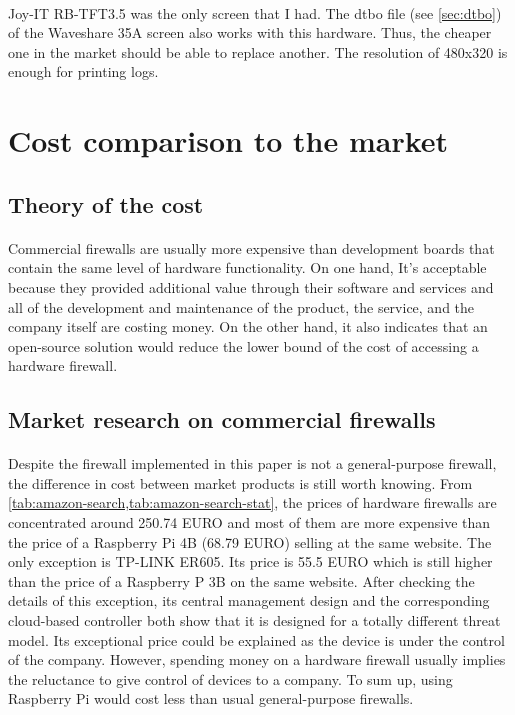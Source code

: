 \documentclass[mscthesis]{usiinfthesis}
\begin{document}
\paragraph{}
Joy-IT RB-TFT3.5 was the only screen that I had. The dtbo file (see \cref{sec:dtbo}) of the Waveshare 35A screen also works with this hardware. Thus, the cheaper one in the market should be able to replace another. The resolution of 480x320 is enough for printing logs.

\section{Cost comparison to the market}
\subsection{Theory of the cost}
\paragraph{}
Commercial firewalls are usually more expensive than development boards that contain the same level of hardware functionality. On one hand, It's acceptable because they provided additional value through their software and services and all of the development and maintenance of the product, the service, and the company itself are costing money. On the other hand, it also indicates that an open-source solution would reduce the lower bound of the cost of accessing a hardware firewall.

\subsection{Market research on commercial firewalls}
\paragraph{}
Despite the firewall implemented in this paper is not a general-purpose firewall, the difference in cost between market products is still worth knowing. From \cref{tab:amazon-search,tab:amazon-search-stat}, the prices of hardware firewalls are concentrated around 250.74 EURO and most of them are more expensive than the price of a Raspberry Pi 4B (68.79 EURO) selling at the same website. The only exception is TP-LINK ER605. Its price is 55.5 EURO which is still higher than the price of a Raspberry P 3B on the same website. After checking the details of this exception, its central management design and the corresponding cloud-based controller both show that it is designed for a totally different threat model. Its exceptional price could be explained as the device is under the control of the company. However, spending money on a hardware firewall usually implies the reluctance to give control of devices to a company. To sum up, using Raspberry Pi would cost less than usual general-purpose firewalls.
\end{document}
